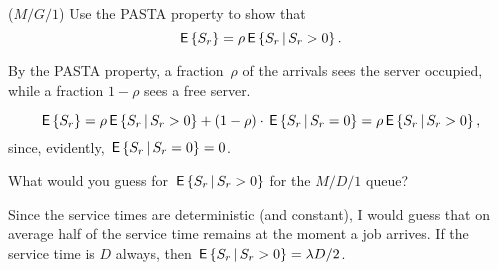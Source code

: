 \begin{exercise}($M/G/1$)
Use  the PASTA property to show that 
\begin{equation}\label{eq:37}
\,\mathsf{E}\left\{S_r\right\} =  \rho \,\mathsf{E}\left\{S_r\,\middle|\, S_r>0\right\}.
\end{equation}
\begin{hint}
By the PASTA property, a fraction~$\rho$ of the arrivals sees the server occupied, while a fraction $1-\rho$ sees
a free server.  
\end{hint}
\begin{solution}
\begin{equation*}
\,\mathsf{E}\left\{S_r\right\} =   \rho \,\mathsf{E}\left\{S_r\,\middle|\, S_r >0\right\} + (1-\rho)\cdot \,\mathsf{E}\left\{S_r\,\middle|\, S_r = 0\right\} = \rho \,\mathsf{E}\left\{S_r\,\middle|\, S_r>0\right\},
\end{equation*}
since, evidently, $\,\mathsf{E}\left\{S_r\,\middle|\, S_r=0\right\}=0$.  
\end{solution}
\end{exercise}

\begin{exercise}
  What would you guess for $\,\mathsf{E}\left\{S_r\,\middle|\, S_r>0\right\}$ for the $M/D/1$ queue? 
  \begin{solution}
    Since the service times are deterministic (and constant), I would
    guess that on average half of the service time remains at the
    moment a job arrives. If the service time is $D$ always, then
    $\,\mathsf{E}\left\{S_r\,\middle|\, S_r>0\right\} = \lambda D/2$.  
  \end{solution}
\end{exercise}

